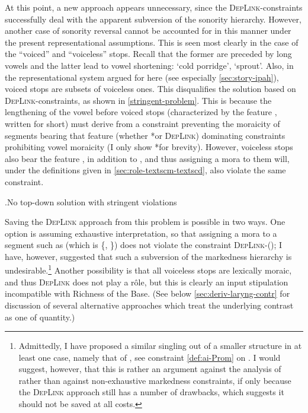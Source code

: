 At this point, a new approach appears unnecessary, since the \textsc{DepLink}-\mo constraints successfully deal with the apparent subversion of the sonority hierarchy. However, another case of sonority reversal cannot be accounted for in this manner under the present representational assumptions. This is seen most clearly in the case of the \enquote{voiced} and \enquote{voiceless} stops. Recall that the former are preceded by long vowels and the latter lead to vowel shortening: \ipa{[ˈsopas]} `cold porridge', \ipa{[ˈeːɡin]} `sprout'. Also, in the representational system argued for here (see especially \cref{sec:story-ipah}), voiced stops are subsets of voiceless ones. This disqualifies the solution based on \textsc{DepLink}-\mo constraints, as shown in \ref{stringent-problem}. This is because the lengthening of the vowel before voiced stops (characterized by the feature , written  for short) must derive from a constraint preventing the moraicity of segments bearing that feature (whether *\mo or \textsc{DepLink}) dominating constraints prohibiting vowel moraicity (I only show *\mo for brevity). However, voiceless stops also bear the feature , in addition to , and thus assigning a mora to them will, under the definitions given in \cref{sec:role-textscm-textscd}, also violate the same constraint.

\ex.\label{stringent-problem}No top\hyp down solution with stringent violations\\

Saving the \textsc{DepLink} approach from this problem is possible in two ways. One option is assuming exhaustive interpretation, so that assigning a mora to a segment such as \ipa{[k]} (which is \{, \}) does not violate the constraint \textsc{DepLink}-\mo(); I have, however, suggested that such a subversion of the markedness hierarchy is undesirable.\footnote{Admittedly, I have proposed a similar singling out of a smaller structure in at least one case, namely that of \ipa{[ai]}, see constraint \cref{def:ai-Prom} on . I would suggest, however, that this is rather an argument against the analysis of \ipa{[ai]} rather than against non\hyp exhaustive markedness constraints, if only because the \textsc{DepLink} approach still has a number of drawbacks, which suggests it should not be saved at all costs.} Another possibility is that all voiceless stops are lexically moraic, and thus \textsc{DepLink} does not play a rôle, but this is clearly an input stipulation incompatible with Richness of the Base. (See below \cref{sec:deriv-laryng-contr} for discussion of several alternative approaches which treat the underlying contrast as one of quantity.)

